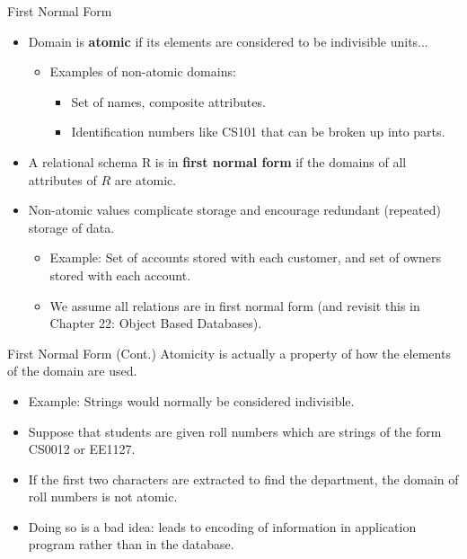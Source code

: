 \documentclass{beamer}
\begin{document}
\begin{frame}{First Normal Form}
    \begin{itemize}
        \item Domain is \textbf{atomic} if its elements are considered to be indivisible units...
            \begin{itemize}
                \item Examples of non-atomic domains:
                    \begin{itemize}
                        \item Set of names, composite attributes.
                        \item Identification numbers like CS101 that can be broken up into parts.
                    \end{itemize}
            \end{itemize}
        \item A relational schema R is in \textbf{first normal form} if the domains of all attributes of $R$ are atomic.
        \item Non-atomic values complicate storage and encourage redundant (repeated) storage of data.
            \begin{itemize}
                \item Example: Set of accounts stored with each customer, and set of owners stored with each account.
                \item We assume all relations are in first normal form (and revisit this in Chapter 22: Object Based Databases).
            \end{itemize}
    \end{itemize}
\end{frame}

\begin{frame}{First Normal Form (Cont.)}
    Atomicity is actually a property of how the elements of the domain are used.
        \begin{itemize}
            \item Example: Strings would normally be considered indivisible.
            \item Suppose that students are given roll numbers which are strings of the form CS0012 or EE1127.
            \item If the first two characters are extracted to find the department, the domain of roll numbers is not atomic.
            \item Doing so is a bad idea: leads to encoding of information in application program rather than in the database.
        \end{itemize}
\end{frame}
\end{document}
